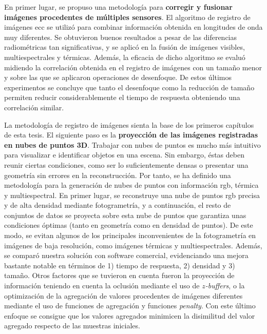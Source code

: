 En primer lugar, se propuso una metodología para \textbf{corregir y fusionar imágenes procedentes de múltiples sensores}. El algoritmo de registro de imágenes \acrshort{ecc} se utilizó para combinar información obtenida en longitudes de onda muy diferentes. Se obtuvieron buenos resultados a pesar de las diferencias radiométricas tan significativas, y se aplicó en la fusión de imágenes visibles, multiespectrales y térmicas. Además, la eficacia de dicho algoritmo se evaluó midiendo la correlación obtenida en el registro de imágenes con un tamaño menor y sobre las que se aplicaron operaciones de desenfoque. De estos últimos experimentos se concluye que tanto el desenfoque como la reducción de tamaño permiten reducir considerablemente el tiempo de respuesta obteniendo una correlación similar.

La metodología de registro de imágenes sienta la base de los primeros capítulos de esta tesis. El siguiente paso es la \textbf{proyección de las imágenes registradas en nubes de puntos 3D}. Trabajar con nubes de puntos es mucho más intuitivo para visualizar e identificar objetos en una escena. Sin embargo, éstas deben reunir ciertas condiciones, como ser lo suficientemente densas o presentar una geometría sin errores en la reconstrucción. Por tanto, se ha definido una metodología para la generación de nubes de puntos con información \acrshort{rgb}, térmica y multiespectral. En primer lugar, se reconstruye una nube de puntos \acrshort{rgb} precisa y de alta densidad mediante fotogrametría, y a continuación, el resto de conjuntos de datos se proyecta sobre esta nube de puntos que garantiza unas condiciones óptimas (tanto en geometría como en densidad de puntos). De este modo, se evitan algunos de los principales inconvenientes de la fotogrametría en imágenes de baja resolución, como imágenes térmicas y multiespectrales. Además, se comparó nuestra solución con software comercial, evidenciando una mejora bastante notable en términos de 1) tiempo de respuesta, 2) densidad y 3) tamaño. Otros factores que se tuvieron en cuenta fueron la proyección de información teniendo en cuenta la oclusión mediante el uso de \textit{$z$-buffers}, o la optimización de la agregación de valores procedentes de imágenes diferentes mediante el uso de funciones de agregación y funciones \textit{penalty}. Con este último enfoque se consigue que los valores agregados minimicen la disimilitud del valor agregado respecto de las muestras iniciales. 

